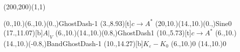 \unitlength=1bp%

\begin{feynartspicture}(200,200)(1,1)

\FADiagram{}
\FAProp(0.,10.)(6.,10.)(0.,){GhostDash}{-1}
\FALabel(3.,8.93)[t]{$c\to A^*$}
\FAProp(20,10.)(14.,10.)(0.,){Sine}{0}
\FALabel(17.,11.07)[b]{$A|_V$}
\FAProp(6.,10.)(14.,10.)(0.8,){GhostDash}{1}
\FALabel(10.,5.73)[t]{$c\to A^*$}
\FAProp(6.,10.)(14.,10.)(-0.8,){BandGhostDash}{-1}
\FALabel(10.,14.27)[b]{$K_\varepsilon-K_0$}
\FAVert(6.,10.){0}
\FAVert(14.,10.){0}
\end{feynartspicture}

